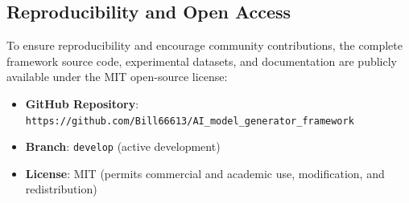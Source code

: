 \subsection{Reproducibility and Open Access}

To ensure reproducibility and encourage community contributions, the complete framework source code, experimental datasets, and documentation are publicly available under the MIT open-source license:

\begin{itemize}
    \item \textbf{GitHub Repository}: \texttt{https://github.com/Bill66613/AI\_model\_generator\_framework}
    \item \textbf{Branch}: \texttt{develop} (active development)
    \item \textbf{License}: MIT (permits commercial and academic use, modification, and redistribution)
\end{itemize}

